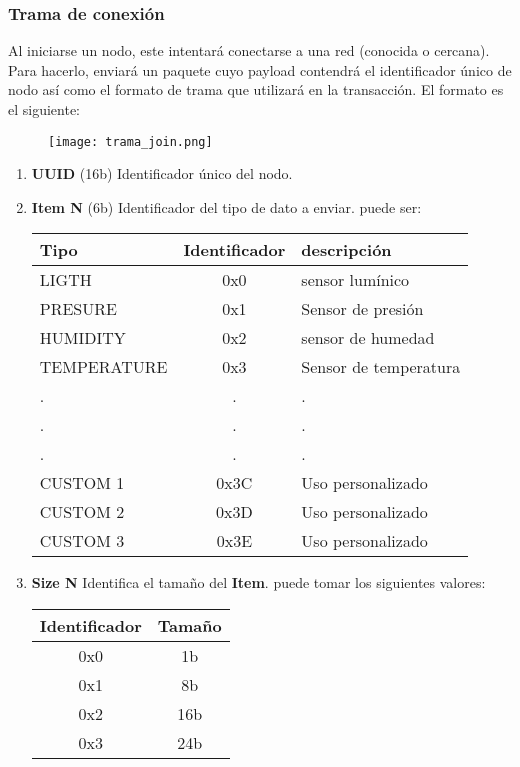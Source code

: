 \subsubsection{Trama de conexión} \label{ConnectionPay}

	Al iniciarse un nodo, este intentará conectarse a una red (conocida o cercana). Para  hacerlo, enviará un paquete cuyo payload contendrá el identificador único de nodo así como el formato de trama que utilizará en la transacción. El formato es el siguiente:
	
	\begin{figure}[!h]
		\texttt{[image: trama\_join.png]}
		\centering
	\end{figure}

	\begin{enumerate}
		\item \textbf{UUID } (16b) Identificador único del nodo.
	 	\item \textbf{Item N} (6b) Identificador del tipo de dato a enviar. puede ser:
		
		\begin{center}
			\begin{tabular}{|l c l|}
				\hline
				Tipo & Identificador & descripción \\
				\hline \hline
				LIGTH 		& 0x0 & sensor lumínico \\
				PRESURE 	& 0x1 & Sensor de presión \\
				HUMIDITY 	& 0x2 & sensor de humedad \\
				TEMPERATURE	& 0x3 & Sensor de temperatura \\
				.			& . & . \\
				.			& . & . \\
				.			& . & . \\
				CUSTOM 1	& 0x3C & Uso personalizado \\
				CUSTOM 2	& 0x3D & Uso personalizado \\
				CUSTOM 3	& 0x3E & Uso personalizado \\
				\hline
			
			\end{tabular}
		\end{center}
	
		\item \textbf{Size N} Identifica el tamaño del \textbf{Item}. puede tomar los siguientes valores:
		
		\begin{center}
			\begin{tabular}{|c c|}
			\hline
			Identificador & Tamaño \\
			\hline \hline
			0x0	&	1b \\
			0x1 &	8b \\
			0x2	&	16b \\
			0x3 &	24b\\
			\hline
			\end{tabular}
		\end{center}
	\end{enumerate}
	
